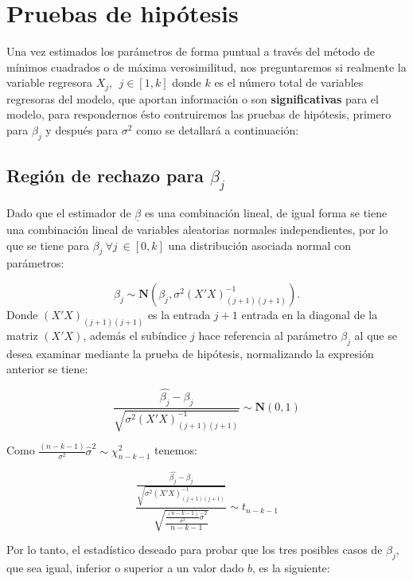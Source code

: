 \documentclass[
  a4paper,
  oneside,
  openany]{book}
\begin{document}
\hypertarget{pruebas-de-hipuxf3tesis-1}{%
\chapter{Pruebas de hipótesis}\label{pruebas-de-hipuxf3tesis-1}}

Una vez estimados los parámetros de forma puntual a través del método de mínimos cuadrados o de máxima verosimilitud, nos preguntaremos si realmente la variable regresora \(X_{j}, \ \ j \in [1,k]\) donde \(k\) es el número total de variables regresoras del modelo, que aportan información o son \textbf{significativas} para el modelo, para respondernos ésto contruiremos las pruebas de hipótesis, primero para \(\beta_{j}\) y después para \(\sigma^2\) como se detallará a continuación:

\hypertarget{regiuxf3n-de-rechazo-para-beta_j}{%
\section{\texorpdfstring{Región de rechazo para \(\beta_{j}\)}{Región de rechazo para \textbackslash beta\_\{j\}}}\label{regiuxf3n-de-rechazo-para-beta_j}}

Dado que el estimador de \(\underline{\beta}\) es una combinación lineal, de igual forma se tiene una combinación lineal de variables aleatorias normales independientes, por lo que se tiene para \(\beta_{j} \ \forall j \ \in [0,k]\) una distribución asociada normal con parámetros:

\[\beta_{j} \sim \mathbf{N} \left(\beta_{j},\sigma^2(X'X)^{-1}_{(j+1)(j+1)}\right).\]
Donde \((X'X)_{(j+1)(j+1)}\) es la entrada \(j+1\) entrada en la diagonal de la matriz \((X'X)\), además el subíndice \(j\) hace referencia al parámetro \(\beta_{j}\) al que se desea examinar mediante la prueba de hipótesis, normalizando la expresión anterior se tiene:

\[\frac{\hat{\beta_{j}}-\beta_{j}}{\sqrt{\sigma^2(X'X)^{-1}_{(j+1)(j+1)}}} \sim \mathbf{N}(0,1)\]

Como \(\frac{(n-k-1)}{\sigma^2}\hat{\sigma}^2 \sim \chi^{2}_{n-k-1}\) tenemos:

\[\frac{\frac{\hat{\beta_{j}}-\beta_{j}}{\sqrt{\sigma^2(X'X)^{-1}_{(j+1)(j+1)}}}}{\sqrt{\frac{\frac{(n-k-1)}{\sigma^2}\hat{\sigma}^2}{n-k-1}}}\sim t_{n-k-1}\]

Por lo tanto, el estadístico deseado para probar que los tres posibles casos de \(\beta_{j}\), que sea igual, inferior o superior a un valor dado \(b\), es la siguiente:
\end{document}
